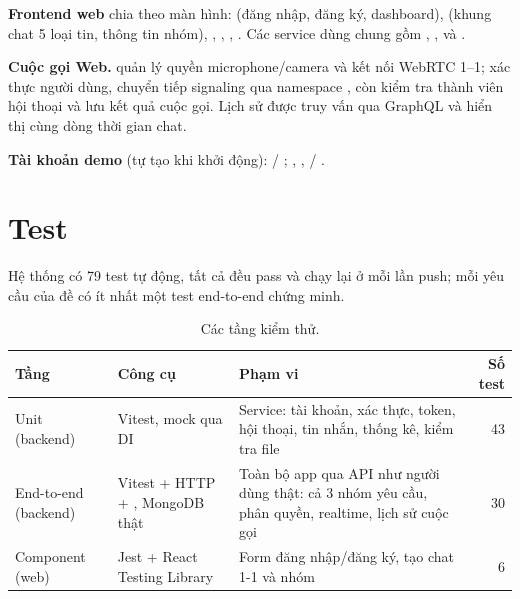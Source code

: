 \documentclass[11pt, a4paper]{article}
\begin{document}
\textbf{Frontend web} chia theo màn hình:  (đăng nhập, đăng ký, dashboard),  (khung chat 5 loại tin, thông tin nhóm), , , , . Các service dùng chung gồm , ,  và .

\textbf{Cuộc gọi Web.}  quản lý quyền microphone/camera và kết nối WebRTC 1--1;  xác thực người dùng, chuyển tiếp signaling qua namespace , còn  kiểm tra thành viên hội thoại và lưu kết quả cuộc gọi. Lịch sử được truy vấn qua GraphQL và hiển thị cùng dòng thời gian chat.

\textbf{Tài khoản demo} (tự tạo khi khởi động):  / ; , ,  / .

\section{Test}
\label{sec:test}

Hệ thống có 79 test tự động, tất cả đều pass và chạy lại ở mỗi lần push; mỗi yêu cầu của đề có ít nhất một test end-to-end chứng minh.

\begin{table}[H]
  \centering
  \small
  \caption{Các tầng kiểm thử.}
  \label{tab:testlevels}
  \begin{tabularx}{\linewidth}{lP{3.4cm}Yr}
    \toprule
    \textbf{Tầng} & \textbf{Công cụ} & \textbf{Phạm vi} & \textbf{Số test} \\
    \midrule
    Unit (backend) & Vitest, mock qua DI & Service: tài khoản, xác thực, token, hội thoại, tin nhắn, thống kê, kiểm tra file & 43 \\
    End-to-end (backend) & Vitest + HTTP + , MongoDB thật & Toàn bộ app qua API như người dùng thật: cả 3 nhóm yêu cầu, phân quyền, realtime, lịch sử cuộc gọi & 30 \\
    Component (web) & Jest + React Testing Library & Form đăng nhập/đăng ký, tạo chat 1-1 và nhóm & 6 \\
    \bottomrule
  \end{tabularx}
\end{table}
\end{document}
